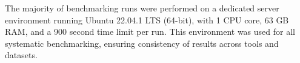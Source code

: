 The majority of benchmarking runs were performed on a dedicated server environment running Ubuntu 22.04.1 LTS (64-bit), with 1 CPU core, 63 GB RAM, and a 900 second time limit per run. This environment was used for all systematic benchmarking, ensuring consistency of results across tools and datasets.



\begin{comment}
# Benchmark environment for profiling:
Hardware Model -- Dell Inc. Latitude E7470
Memory -- 8.0GiB
Processor -- Intel® Core™ i7-6600U CPU @ 2.60GHz × 4
Graphics -- Mesa Intel® HD Graphics 520 (SKL GT2)
Disk Capacity -- 256.1GB
OS Name -- Ubuntu 22.04.1 LTS
OS Type -- 64-bit

# Benchmark environment for all benchmarking other than profiling:
options:
resource limits:
- memory:                63000.0 MB
- time:                  900 s
- cpu cores:             1

# 100_to_100k_voter
RUN 1:
- Only SCRAM has been tested against this dataset. Only wall clock time has been recorded.

# 1_to_4k/saphsolve-jsinp
- SCRAM (MOCUS REA, MOCUS MCUB, BDD), XFTA, SAPHSOLVE have been benchmarked.
- Wall time, CPU time, and memory usage have been calculated.

# 1_to_50k

RUN 3:
- SAPHSOLVE and XFTA
- SAPHSOLVE (MOCUS MCUB) has been benchmarked for 2 truncation limits: 1E-14 and 1E-20.

# 1_to_5k

RUN 1:
- SAPHSOLVE and XFTA
- SCRAM (MOCUS REA, MOCUS MCUB, BDD), XFTA, SAPHSOLVE have been benchmarked.
- Wall time, CPU time, and memory usage have been calculated.

RUN 2:
- Only SAPHSOLVE
- Only CPU time and clock time

# 2_to_100k

RUN 2:
- SCRAM and XFTA have been tested against this dataset. For SCRAM - MOCUS, BDD, ZBDD have been utilized but in case of XFTA it is unknown which algorithm it used (MOCUS or BDD?).
-Only the wall clock time and CPU time have been calculated.

RUN 3:
- Both SCRAM and XFTA have been tested against this dataset. Wall time, CPU time, and memory usage have been calculated.

# 500_to_750
- Used for profiling SCRAM using scram.
- MOCUS, BDD, ZBDD algorithms have been tested.
- Probability analysis, importance measures, uncertainty analysis with 10,000 samples.
- Also, this dataset contained common cause failure groups. CCF analysis was done for SCRAM.
Here is an example CLI argument:
--probability --ccf --mocus --rare-event --importance --uncertainty --num-trials 10000


\end{comment}
